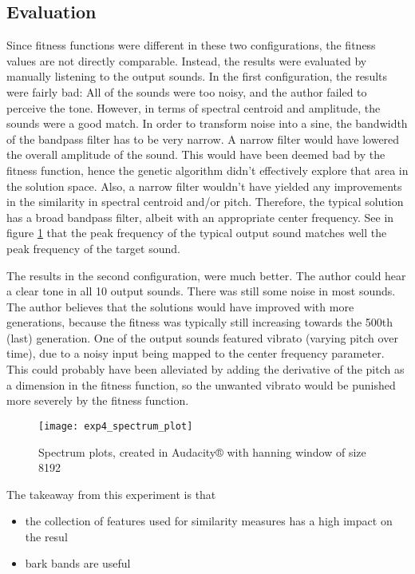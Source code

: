 \subsection{Evaluation}
Since fitness functions were different in these two configurations, the fitness values are not directly comparable. Instead, the results were evaluated by manually listening to the output sounds. In the first configuration, the results were fairly bad: All of the sounds were too noisy, and the author failed to perceive the tone. However, in terms of spectral centroid and amplitude, the sounds were a good match. In order to transform noise into a sine, the bandwidth of the bandpass filter has to be very narrow. A narrow filter would have lowered the overall amplitude of the sound. This would have been deemed bad by the fitness function, hence the genetic algorithm didn't effectively explore that area in the solution space. Also, a narrow filter wouldn't have yielded any improvements in the similarity in spectral centroid and/or pitch. Therefore, the typical solution has a broad bandpass filter, albeit with an appropriate center frequency. See in figure \ref{fig:exp4_spectrum_plot} that the peak frequency of the typical output sound matches well the peak frequency of the target sound.

The results in the second configuration, were much better. The author could hear a clear tone in all 10 output sounds. There was still some noise in most sounds. The author believes that the solutions would have improved with more generations, because the fitness was typically still increasing towards the 500th (last) generation. One of the output sounds featured vibrato (varying pitch over time), due to a noisy input being mapped to the center frequency parameter. This could probably have been alleviated by adding the derivative of the pitch as a dimension in the fitness function, so the unwanted vibrato would be punished more severely by the fitness function.

\begin{figure}[h]
    \centering
    \texttt{[image: exp4\_spectrum\_plot]}
    \caption{Spectrum plots, created in Audacity® with hanning window of size 8192}
    \label{fig:exp4_spectrum_plot}
\end{figure}

The takeaway from this experiment is that
\begin{itemize}  
\item the collection of features used for similarity measures has a high impact on the resul
\item bark bands are useful
\end{itemize}

